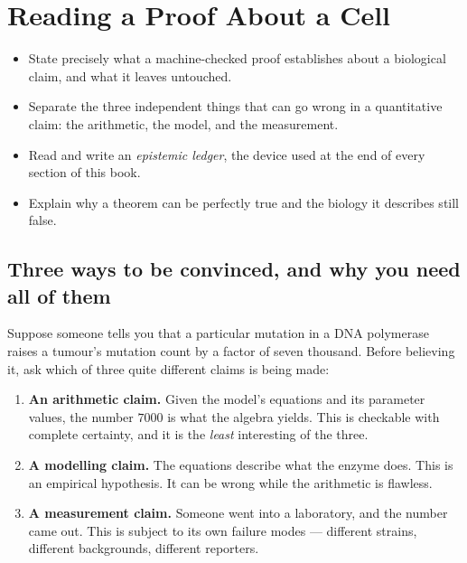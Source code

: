 \section{Reading a Proof About a Cell}\label{sec:proof-and-cell}

\begin{objectives}
\begin{itemize}[leftmargin=*,itemsep=1pt,topsep=1pt]
  \item State precisely what a machine-checked proof establishes about a biological claim, and what it leaves untouched.
  \item Separate the three independent things that can go wrong in a quantitative claim: the arithmetic, the model, and the measurement.
  \item Read and write an \emph{epistemic ledger}, the device used at the end of every section of this book.
  \item Explain why a theorem can be perfectly true and the biology it describes still false.
\end{itemize}
\end{objectives}

\subsection{Three ways to be convinced, and why you need all of them}

Suppose someone tells you that a particular mutation in a DNA polymerase raises a
tumour's mutation count by a factor of seven thousand. Before believing it, ask
which of three quite different claims is being made:

\begin{enumerate}[leftmargin=*,itemsep=2pt]
  \item \textbf{An arithmetic claim.} Given the model's equations and its parameter
        values, the number $7000$ is what the algebra yields. This is checkable
        with complete certainty, and it is the \emph{least} interesting of the three.
  \item \textbf{A modelling claim.} The equations describe what the enzyme does.
        This is an empirical hypothesis. It can be wrong while the arithmetic is flawless.
  \item \textbf{A measurement claim.} Someone went into a laboratory, and the
        number came out. This is subject to its own failure modes --- different
        strains, different backgrounds, different reporters.
\end{enumerate}

